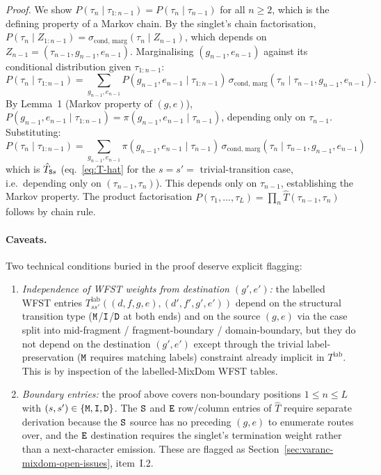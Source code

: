 \emph{Proof.} We show $P(\tau_n \mid \tau_{1:n-1}) = P(\tau_n \mid
\tau_{n-1})$ for all $n \geq 2$, which is the defining property of
a Markov chain. By the singlet's chain factorisation, $P(\tau_n
\mid Z_{1:n-1}) = \sigma_{\text{cond, marg}}(\tau_n \mid Z_{n-1})$,
which depends on $Z_{n-1} = (\tau_{n-1}, g_{n-1}, e_{n-1})$.
Marginalising $(g_{n-1}, e_{n-1})$ against its conditional
distribution given $\tau_{1:n-1}$:
\[
P(\tau_n \mid \tau_{1:n-1}) = \sum_{g_{n-1}, e_{n-1}}
   P(g_{n-1}, e_{n-1} \mid \tau_{1:n-1})\,
   \sigma_{\text{cond, marg}}(\tau_n \mid \tau_{n-1}, g_{n-1}, e_{n-1}).
\]
By Lemma~1 (Markov property of $(g, e)$), $P(g_{n-1}, e_{n-1} \mid
\tau_{1:n-1}) = \pi(g_{n-1}, e_{n-1} \mid \tau_{n-1})$, depending
only on $\tau_{n-1}$. Substituting:
\[
P(\tau_n \mid \tau_{1:n-1}) = \sum_{g_{n-1}, e_{n-1}}
   \pi(g_{n-1}, e_{n-1} \mid \tau_{n-1})\,
   \sigma_{\text{cond, marg}}(\tau_n \mid \tau_{n-1}, g_{n-1}, e_{n-1})
\]
which is $\hat T_{{\tt S} s}$ (eq.~\eqref{eq:T-hat} for the $s = s' = $
trivial-transition case, i.e.\ depending only on $(\tau_{n-1},
\tau_n)$). This depends only on $\tau_{n-1}$, establishing the
Markov property. The product factorisation $P(\tau_1, \ldots,
\tau_L) = \prod_n \hat T(\tau_{n-1}, \tau_n)$ follows by chain
rule. \qedhere

\paragraph{Caveats.} Two technical conditions buried in the proof
deserve explicit flagging:
\begin{enumerate}[nosep]
\item \emph{Independence of WFST weights from destination $(g', e')$:}
the labelled WFST entries $T^{\text{lab}}_{ss'}((d, f, g, e),
(d', f', g', e'))$ depend on the structural transition type
(${\tt M}$/${\tt I}$/${\tt D}$ at both ends) and on
the source $(g, e)$ via the case split into mid-fragment /
fragment-boundary / domain-boundary, but they do not depend on
the destination $(g', e')$ except through the trivial label-preservation
(${\tt M}$ requires matching labels) constraint already implicit in
$T^{\text{lab}}$. This is by inspection of the labelled-MixDom WFST
tables.
\item \emph{Boundary entries:} the proof above covers
non-boundary positions $1 \leq n \leq L$ with $(s, s') \in \{{\tt M},
{\tt I}, {\tt D}\}$. The ${\tt S}$ and ${\tt E}$ row/column entries of $\hat T$
require separate derivation because the ${\tt S}$ source has no
preceding $(g, e)$ to enumerate routes over, and the ${\tt E}$
destination requires the singlet's termination weight rather than a
next-character emission. These are flagged as
Section~\ref{sec:varanc-mixdom-open-issues}, item~I.2.
\end{enumerate}

